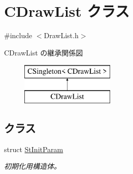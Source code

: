 \hypertarget{class_c_draw_list}{}\section{C\+Draw\+List クラス}
\label{class_c_draw_list}


{\ttfamily \#include $<$Draw\+List.\+h$>$}

C\+Draw\+List の継承関係図\begin{figure}[H]
\begin{center}
\leavevmode
\includegraphics[height=2.000000cm]{class_c_draw_list}
\end{center}
\end{figure}
\subsection*{クラス}
\begin{DoxyCompactItemize}
\item 
struct \hyperlink{struct_c_draw_list_1_1_st_init_param}{St\+Init\+Param}
\begin{DoxyCompactList}\small\item\em 初期化用構造体。 \end{DoxyCompactList}\end{DoxyCompactItemize}
